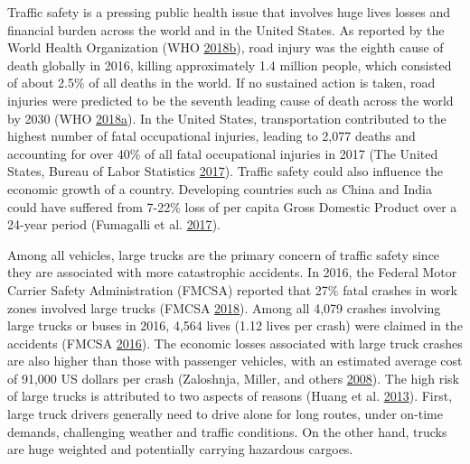 \documentclass[]{elsarticle} %
\begin{document}
Traffic safety is a pressing public health issue that involves huge lives losses and financial burden across the world and in the United States. As reported by the World Health Organization (WHO \protect\hyperlink{ref-who2018}{2018}\protect\hyperlink{ref-who2018}{b}), road injury was the eighth cause of death globally in 2016, killing approximately 1.4 million people, which consisted of about 2.5\% of all deaths in the world. If no sustained action is taken, road injuries were predicted to be the seventh leading cause of death across the world by 2030 (WHO \protect\hyperlink{ref-who2018b}{2018}\protect\hyperlink{ref-who2018b}{a}). In the United States, transportation contributed to the highest number of fatal occupational injuries, leading to 2,077 deaths and accounting for over 40\% of all fatal occupational injuries in 2017 (The United States, Bureau of Labor Statistics \protect\hyperlink{ref-bols}{2017}). Traffic safety could also influence the economic growth of a country. Developing countries such as China and India could have suffered from 7-22\% loss of per capita Gross Domestic Product over a 24-year period (Fumagalli et al. \protect\hyperlink{ref-fumagalli2017high}{2017}).

Among all vehicles, large trucks are the primary concern of traffic safety since they are associated with more catastrophic accidents. In 2016, the Federal Motor Carrier Safety Administration (FMCSA) reported that 27\% fatal crashes in work zones involved large trucks (FMCSA \protect\hyperlink{ref-fmcsareport2016}{2018}). Among all 4,079 crashes involving large trucks or buses in 2016, 4,564 lives (1.12 lives per crash) were claimed in the accidents (FMCSA \protect\hyperlink{ref-fmcsafacts2016}{2016}). The economic losses associated with large truck crashes are also higher than those with passenger vehicles, with an estimated average cost of 91,000 US dollars per crash (Zaloshnja, Miller, and others \protect\hyperlink{ref-zaloshnja2008unit}{2008}). The high risk of large trucks is attributed to two aspects of reasons (Huang et al. \protect\hyperlink{ref-huang2013development}{2013}). First, large truck drivers generally need to drive alone for long routes, under on-time demands, challenging weather and traffic conditions. On the other hand, trucks are huge weighted and potentially carrying hazardous cargoes.
\end{document}

